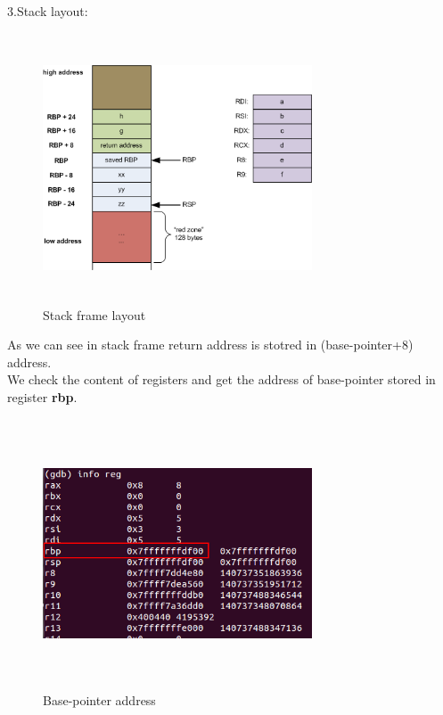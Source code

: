 \documentclass{article}
\begin{document}
    3.Stack layout:    
         \begin{figure}[H]
            \begin{center}
		\includegraphics[width=8cm,height=8cm]{stack.png}
	\caption{Stack frame layout}
	  \end{center}
	\end{figure}
        
        As we can see in stack frame return address is stotred in (base-pointer+8) address.\\
        We check the content of registers and get the address of base-pointer stored in register \textbf{rbp}.\\
         
         \begin{figure}[H]
          \begin{center}
		\includegraphics[width=8cm,height=8cm]{reg.png}
	\caption{Base-pointer address}
	\end{center}
	\end{figure}
         
\end{document}
